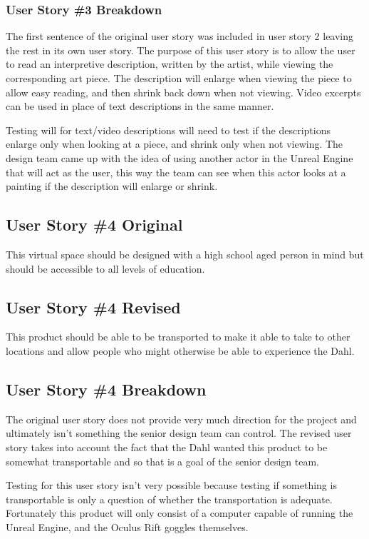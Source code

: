 \subsubsection{User Story \#3 Breakdown}
The first sentence of the original user story was included in user story 2 leaving the rest in its own user story.  The purpose of this user story is to allow the user to read an interpretive description, written by the artist, while viewing the corresponding art piece.  The description will enlarge when viewing the piece to allow easy reading, and then shrink back down when not viewing.  Video excerpts can be used in place of text descriptions in the same manner. 

Testing will for text/video descriptions will need to test if the descriptions enlarge only when looking at a piece, and shrink only when not viewing.  The design team came up with the idea of using another actor in the Unreal Engine that will act as the user, this way the team can see when this actor looks at a painting if the description will enlarge or shrink.

\hrulefill

\subsection{User Story \#4 Original}
This virtual space should be designed with a high school aged person in mind but should be accessible to all levels of education.

\subsection{User Story \#4 Revised}
This product should be able to be transported to make it able to take to other locations and allow people who might otherwise be able to experience the Dahl.

\subsection{User Story \#4 Breakdown}
The original user story does not provide very much direction for the project and ultimately isn't something the senior design team can control.  The revised user story takes into account the fact that the Dahl wanted this product to be somewhat transportable and so that is a goal of the senior design team.  

Testing for this user story isn't very possible because testing if something is transportable is only a question of whether the transportation is adequate.  Fortunately this product will only consist of a computer capable of running the Unreal Engine, and the Oculus Rift goggles themselves.

